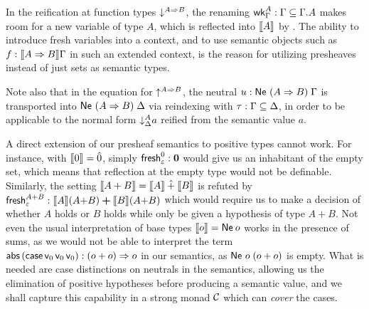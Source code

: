 \documentclass[sigplan,screen]{acmart}
\begin{document}
In the reification at function types
$\down{A \To B}$,
the renaming $\twk^A_\Gamma : \Gamma \sublist \cext \Gamma A$
makes room
for a new variable of type $A$, which is reflected into $\den A$ by
.
The ability to introduce fresh variables into a context, and to use
semantic objects such as $f : \den{A \To B}\Gamma$ in such an extended
context, is the reason for utilizing presheaves instead of just sets
as semantic types.

Note also that in the equation for $\up{A \To B}$,
the neutral $u : \Ne {(A \To B)} \Gamma$ is
transported into $\Ne {(A \To B)} \Delta$ via reindexing with
$\tau : \Gamma \sublist \Delta$, in order to be applicable to the normal form
$\down[\Delta]A a$
reified from the semantic value $a$.

A direct extension of our presheaf semantics to positive types cannot
work.  For instance, with $\den \tyzero = \hat0$, simply
$\tfresh^{\tyzero}_{\cempty} : \bzero$
would give us an
inhabitant of the empty set, which means that reflection at the empty
type would not be definable.  Similarly, the setting
$\den{A + B} = \den A \hatplus \den B$ is refuted by
$\tfresh^{A + B}_{\cempty} : \den A (A{+}B) \bplus \den B (A{+}B)$
which would require us to make a decision of whether $A$ holds or $B$ holds
while only be given a hypothesis of type $A + B$.
Not even the usual interpretation of base types $\den o = \tNe\,o$
works in the presence of sums, as we would not be able to interpret
the term
$\tabs\,(\tcase\,\vv0\,\vv0\,\vv0) :
(o+o) \To o$ in our semantics, as $\Ne o (o+o)$ is empty.
What is needed are case distinctions on neutrals in the semantics,
allowing us the elimination of positive hypotheses before producing a
semantic value,
and we shall capture this capability in a strong monad $\C$
which can \emph{cover} the cases.
\end{document}
